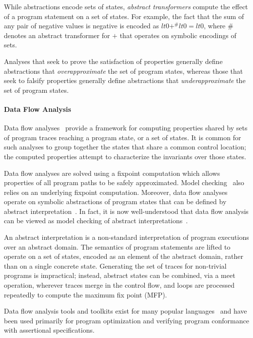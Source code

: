 While abstractions encode sets of states, \textit{abstract transformers}
compute the effect of a program statement on a set of states.  For example,
the fact that the sum of any pair of negative values is negative is
encoded as $lt0 +^\# lt0 = lt0$, where $\#$ denotes an abstract transformer
for $+$ that operates on symbolic encodings of sets.

Analyses that seek to prove the satisfaction of properties generally
define abstractions that \textit{overapproximate} the set of program
states, whereas those that seek to falsify properties generally define
abstractions that \textit{underapproximate} the set of program states.

\paragraph{Data Flow Analysis}
Data flow analyses~\cite{kildall1973unified} 
provide a framework for computing properties shared by sets of
program traces reaching a program state, or a set of states.  It is
common for such analyses to group together the states that share a
common control location; the computed properties attempt to characterize
the invariants over those states.

Data flow analyses are solved using a fixpoint computation which
allows properties of all program paths to be safely approximated.
Model checking~\cite{clarke1999model} also relies on an underlying
fixpoint computation.  Moreover, data flow
analyses operate on symbolic abstractions of program states that
can be defined by abstract interpretation~\cite{cousot1977abstract}. 
In fact, it is now well-understood that data flow analysis can be
viewed as model checking of abstract interpretations~\cite{schmidt1998data}.

An abstract interpretation is a 
non-standard interpretation of program executions over an abstract domain.  
The semantics of program statements are lifted to operate
on a set of states, encoded as an element of the abstract domain,
rather than on a single concrete state.  
Generating the set of traces for non-trivial programs is impractical;
instead, abstract states can be combined, via a meet operation, wherever
traces merge in the control flow, and loops are processed
repeatedly to compute the maximum fix point (MFP).

Data flow analysis tools and toolkits exist for many popular 
languages~\cite{vallee1999soot,fink2012wala}
and have been used primarily for program optimization and
verifying program conformance with assertional specifications.

